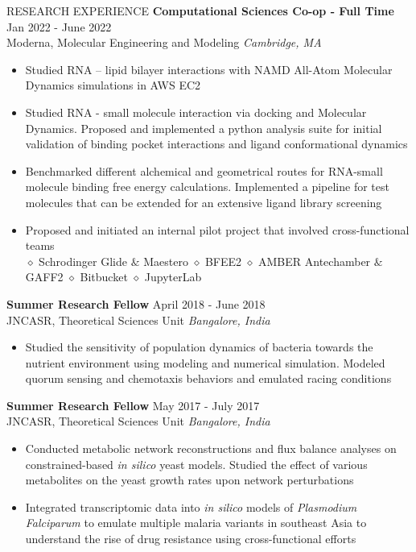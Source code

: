 \documentclass{resume} %
\begin{document}
\begin{rSection}{RESEARCH EXPERIENCE}
   \textbf{Computational Sciences Co-op - Full Time} \hfill Jan 2022 - June 2022\\
   Moderna, Molecular Engineering and Modeling \hfill \textit{Cambridge, MA}
   \begin{itemize}
      \itemsep -2pt {}
      \item Studied RNA – lipid bilayer interactions with NAMD All-Atom Molecular Dynamics simulations in AWS EC2
      \item Studied RNA - small molecule interaction via docking and Molecular Dynamics. Proposed and implemented a python analysis suite for initial validation of binding pocket interactions and ligand conformational dynamics
      \item Benchmarked different alchemical and geometrical routes for RNA-small molecule binding free energy calculations. Implemented a pipeline for test molecules that can be extended for an extensive ligand library screening
      \item  Proposed and initiated an internal pilot project that involved cross-functional teams \\
            $\diamond$ Schrodinger Glide $\&$ Maestero $\diamond$  BFEE2 $\diamond$ AMBER Antechamber $\&$ GAFF2 $\diamond$ Bitbucket $\diamond$ JupyterLab
   \end{itemize}

   \textbf{Summer Research Fellow} \hfill April 2018 - June 2018\\
   JNCASR, Theoretical Sciences Unit \hfill \textit{Bangalore, India}
   \begin{itemize}
      \itemsep -2pt {}
      \item Studied the sensitivity of population dynamics of bacteria towards the nutrient environment using modeling and numerical simulation. Modeled quorum sensing and chemotaxis behaviors and emulated racing conditions
   \end{itemize}

   \textbf{Summer Research Fellow} \hfill May 2017 - July 2017\\
   JNCASR, Theoretical Sciences Unit \hfill \textit{Bangalore, India}
   \begin{itemize}
      \itemsep -2pt {}
      \item Conducted metabolic network reconstructions and flux balance analyses on constrained-based \textit{in silico} yeast models. Studied the effect of various metabolites on the yeast growth rates upon network perturbations
      \item Integrated transcriptomic data into \textit{in silico} models of \textit{Plasmodium Falciparum} to emulate multiple malaria variants in southeast Asia to understand the rise of drug resistance using cross-functional efforts
   \end{itemize}

\end{rSection}
\end{document}
